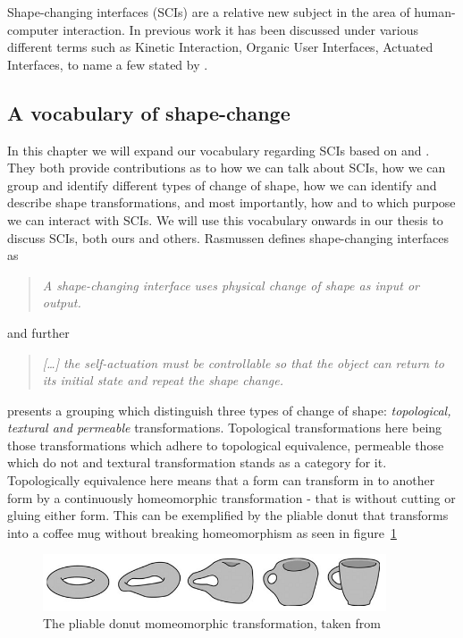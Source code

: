 Shape-changing interfaces (SCIs) are a relative new subject in the area of human-computer interaction.
In previous work it has been discussed under various different terms such as Kinetic Interaction, Organic User Interfaces, Actuated Interfaces, to name a few stated by \citet{rasmussen2012shape}.

\subsection{A vocabulary of shape-change}
In this chapter we will expand our vocabulary regarding SCIs based on \citet{coelho2011shape} and \citet{rasmussen2012shape}.
They both provide contributions as to how we can talk about SCIs, how we can group and identify different types of change of shape, how we can identify and describe shape transformations, and most importantly, how and to which purpose we can interact with SCIs.
We will use this vocabulary onwards in our thesis to discuss SCIs, both ours and others.   
Rasmussen defines shape-changing interfaces as
\begin{quotation}
\emph{A shape-changing interface uses physical change of shape as input or output.}
\end{quotation}
and further
\begin{quotation}
\emph{[\ldots] the self-actuation must be controllable so that the object can return to its initial state and repeat the shape change.}
\end{quotation}

\citeauthor{coelho2011shape} presents a grouping which distinguish three types of change of shape: \emph{topological, textural and permeable} transformations.
Topological transformations here being those transformations which adhere to topological equivalence, permeable those which do not and textural transformation stands as a category for it. Topologically equivalence here means that a form can transform in to another form by a continuously homeomorphic transformation - that is without cutting or gluing either form. This can be exemplified by the pliable donut that transforms into a coffee mug without breaking homeomorphism as seen in figure~\ref{pliable-mug}  

\begin{figure}[hb]
	\centering
  		\includegraphics[width=4in]{figures/pliable-donut}
	\caption[The pliable donut momeomorphic transformation, taken from \citep{coelho2011shape}]
   {The pliable donut momeomorphic transformation, taken from \citep{coelho2011shape}}
   \label{pliable-mug}
\end{figure}   
 
